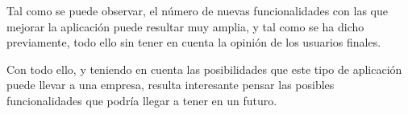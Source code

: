 \documentclass{\ClassPath/viu-tfm-template}
\begin{document}
Tal como se puede observar, el número de nuevas funcionalidades con las que mejorar la aplicación puede resultar muy amplia, y tal como se ha dicho previamente, todo ello sin tener en cuenta la opinión de los usuarios finales.

Con todo ello, y teniendo en cuenta las posibilidades que este tipo de aplicación puede llevar a una empresa, resulta interesante pensar las posibles funcionalidades que podría llegar a tener en un futuro.


\vfill
\pagebreak


\printbibliography[title={Referencias bibliográficas},heading=bibintoc]
%
%
\end{document}
